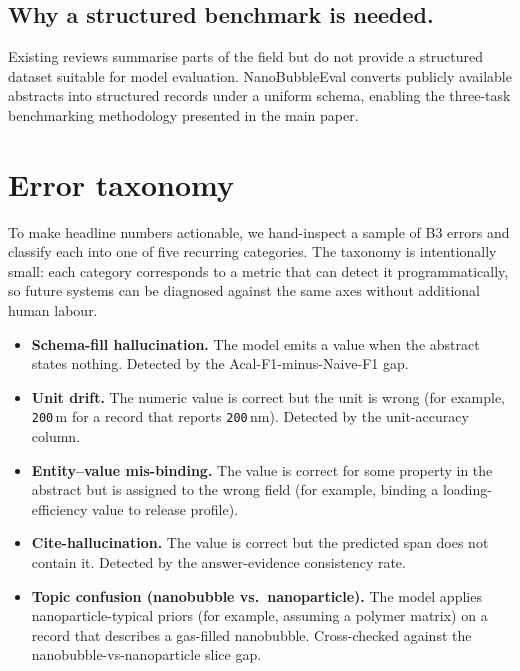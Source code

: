 \documentclass{article}
\begin{document}
\subsection{Why a structured benchmark is needed.}
Existing reviews summarise parts of the field
\citep{Zhou2021GenerationStability,Tan2021StabilitySurface,Jia2023NanobubblesWater,Xiong2021StimuliResponsive}
but do not provide a structured dataset suitable for model
evaluation. NanoBubbleEval converts publicly available abstracts into
structured records under a uniform schema, enabling the three-task
benchmarking methodology presented in the main paper.

\section{Error taxonomy}
\label{app:error_taxonomy}

To make headline numbers actionable, we hand-inspect a sample of B3
errors and classify each into one of five recurring categories. The
taxonomy is intentionally small: each category corresponds to a
metric that can detect it programmatically, so future systems can be
diagnosed against the same axes without additional human labour.

\begin{itemize}\itemsep0pt
\item \textbf{Schema-fill hallucination.} The model emits a value
when the abstract states nothing. Detected by the
Acal-F1-minus-Naive-F1 gap.
\item \textbf{Unit drift.} The numeric value is correct but the unit
is wrong (for example, \texttt{200}\,\textmu{}m for a record that
reports \texttt{200}\,nm). Detected by the unit-accuracy column.
\item \textbf{Entity--value mis-binding.} The value is correct for
some property in the abstract but is assigned to the wrong field
(for example, binding a loading-efficiency value to release
profile).
\item \textbf{Cite-hallucination.} The value is correct but the
predicted span does not contain it. Detected by the answer-evidence
consistency rate.
\item \textbf{Topic confusion (nanobubble vs.\ nanoparticle).} The
model applies nanoparticle-typical priors (for example, assuming a
polymer matrix) on a record that describes a gas-filled nanobubble.
Cross-checked against the nanobubble-vs-nanoparticle slice gap.
\end{itemize}
\end{document}
